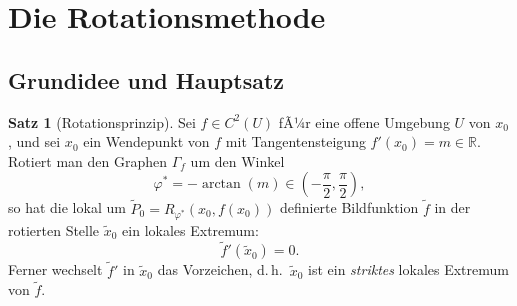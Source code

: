﻿\documentclass[12pt, a4paper]{article}
\theoremstyle{definition}
\newtheorem{satz}{Satz}[section]
\begin{document}
	\section{Die Rotationsmethode}
	
	\subsection{Grundidee und Hauptsatz}
	
	\begin{satz}[Rotationsprinzip]\label{satz:rotation}
		Sei $f \in C^2(U)$ fÃ¼r eine offene Umgebung $U$ von $x_0$, und sei $x_0$
		ein Wendepunkt von $f$ mit Tangentensteigung $f'(x_0) = m \in \mathbb{R}$.
		Rotiert man den Graphen $\Gamma_f$ um den Winkel
		\[
		\varphi^* = -\arctan(m) \in \left(-\frac{\pi}{2}, \frac{\pi}{2}\right),
		\]
		so hat die lokal um $\tilde{P}_0 = R_{\varphi^*}(x_0, f(x_0))$ definierte
		Bildfunktion $\tilde{f}$ in der rotierten Stelle $\tilde{x}_0$ ein lokales
		Extremum:
		\[
		\tilde{f}'(\tilde{x}_0) = 0.
		\]
		Ferner wechselt $\tilde{f}'$ in $\tilde{x}_0$ das Vorzeichen, d.\,h.\
		$\tilde{x}_0$ ist ein \emph{striktes} lokales Extremum von $\tilde{f}$.
	\end{satz}
	
\end{document}
